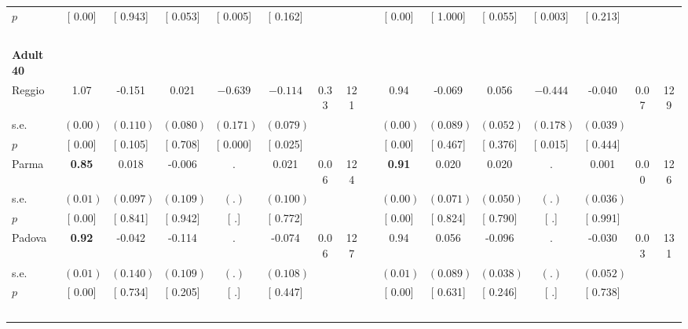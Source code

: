 \begin{longtable}{L{8em} c c c c c c c p{1em} c c c c c c c}
\quad \quad \quad \quad $ p$ & [     0.00] & [    0.943] & [    0.053] & [    0.005] & [    0.162] & & & & [     0.00] & [    1.000] & [    0.055] & [    0.003] & [    0.213] & &  \\[1em]
~\\[1em]
\quad \quad \textbf{Adult 40} & & & & & & & & & & & & & & & \\* 
\quad \quad \quad Reggio& 1.07 &    -0.151 &     0.021 & $ \mathbf{   -0.639}$ & $ \mathbf{   -0.114}$ &      0.33 &       121 & & 0.94 &    -0.069 &     0.056 & $ \mathbf{   -0.444}$ &    -0.040 &      0.07 &       129  \\*
\quad \quad \quad \quad s.e.& $ (     0.00)$ & $ (    0.110)$ & $ (    0.080)$ & $ (    0.171)$ & $ (    0.079)$ & & & & $ (     0.00)$ & $ (    0.089)$ & $ (    0.052)$ & $ (    0.178)$ & $ (    0.039)$ & &  \\*
\quad \quad \quad \quad $ p$ & [     0.00] & [    0.105] & [    0.708] & [    0.000] & [    0.025] & & & & [     0.00] & [    0.467] & [    0.376] & [    0.015] & [    0.444] & &  \\[1em]
\quad \quad \quad Parma& \textbf{     0.85} &     0.018 &    -0.006 &         . &     0.021 &      0.06 &       124 & & \textbf{     0.91} &     0.020 &     0.020 &         . &     0.001 &      0.00 &       126  \\*
\quad \quad \quad \quad s.e.& $ (     0.01)$ & $ (    0.097)$ & $ (    0.109)$ & $ (        .)$ & $ (    0.100)$ & & & & $ (     0.00)$ & $ (    0.071)$ & $ (    0.050)$ & $ (        .)$ & $ (    0.036)$ & &  \\*
\quad \quad \quad \quad $ p$ & [     0.00] & [    0.841] & [    0.942] & [        .] & [    0.772] & & & & [     0.00] & [    0.824] & [    0.790] & [        .] & [    0.991] & &  \\[1em]
\quad \quad \quad Padova& \textbf{     0.92} &    -0.042 &    -0.114 &         . &    -0.074 &      0.06 &       127 & & 0.94 &     0.056 &    -0.096 &         . &    -0.030 &      0.03 &       131  \\*
\quad \quad \quad \quad s.e.& $ (     0.01)$ & $ (    0.140)$ & $ (    0.109)$ & $ (        .)$ & $ (    0.108)$ & & & & $ (     0.01)$ & $ (    0.089)$ & $ (    0.038)$ & $ (        .)$ & $ (    0.052)$ & &  \\*
\quad \quad \quad \quad $ p$ & [     0.00] & [    0.734] & [    0.205] & [        .] & [    0.447] & & & & [     0.00] & [    0.631] & [    0.246] & [        .] & [    0.738] & &  \\[1em]
~\\[1em]

\end{longtable}
